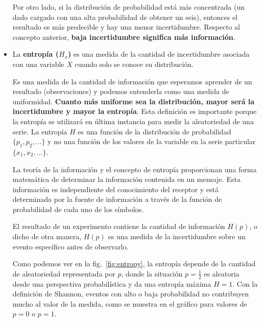 \documentclass[a4paper,12pt]{article}
\begin{document}
\begin{itemize}
Por otro lado, si la distribución de probabilidad está más concentrada (un dado cargado con una alta probabilidad de obtener un seis), entonces el resultado es más predecible y hay una menor incertidumbre. Respecto al concepto anterior, \textbf{baja incertidumbre significa más información}. 

\item La \textbf{entropía ($H_x$)} es una medida de la cantidad de incertidumbre asociada con una variable $X$ cuando solo se conoce su distribución. 

Es una medida de la cantidad de información que esperamos aprender de un resultado (observaciones) y podemos entenderla como una medida de uniformidad. \textbf{Cuanto más uniforme sea la distribución, mayor será la incertidumbre y mayor la entropía}. Esta definición es importante porque la entropía se utilizará en última instancia para medir la aleatoriedad de una serie. La entropía $H$ es una función de la distribución de probabilidad $\{p_1, p_2, \dots \}$ y no una función de los valores de la variable en la serie particular $\{x_1, x_2, \dots\}$. 

La teoría de la información y el concepto de entropía proporcionan una forma matemática de determinar la información contenida en un mensaje. Esta información es independiente del conocimiento del receptor y está determinada por la fuente de información a través de la función de probabilidad de cada uno de los símbolos. 

El resultado de un experimento contiene la cantidad de información $H(p)$, o dicho de otra manera, $H(p)$ es una medida de la incertidumbre sobre un evento específico antes de observarlo.

Como podemos ver en la fig.~\ref{fig:entropy}, la entropía depende de la cantidad de aleatoriedad representada por $p$, donde la situación $p = \frac{1}{2}$ es aleatoria desde una perspectiva probabilística y da una entropía máxima $H=1$. Con la definición de Shannon, eventos con alto o baja probabilidad no contribuyen mucho al valor de la medida, como se muestra en el gráfico para valores de $p =0$ o $p=1$.

\end{itemize}
\end{document}
